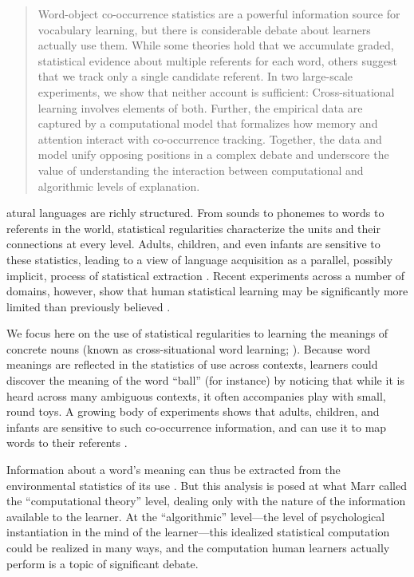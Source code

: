 \documentclass{pnastwo}
\begin{document}
\begin{article}
\begin{abstract}
Word-object co-occurrence statistics are a powerful information source for vocabulary learning, but there is considerable debate about learners actually use them. While some theories hold that we accumulate graded, statistical evidence about multiple referents for each word, others suggest that we track only a single candidate referent. In two large-scale experiments, we show that neither account is sufficient: Cross-situational learning involves elements of both. Further, the empirical data are captured by a computational model that formalizes how memory and attention interact with co-occurrence tracking. Together, the data and model unify opposing positions in a complex debate and underscore the value of understanding the interaction between computational and algorithmic levels of explanation.
\end{abstract}

atural languages are richly structured. From sounds to phonemes to words to referents in the world, statistical regularities characterize the units and their connections at every level. Adults, children, and even infants are sensitive to these statistics, leading to a view of language acquisition as a parallel, possibly implicit, process of statistical extraction \citep{Saffran1996a, Gomez2000}. Recent experiments across a number of domains, however, show that human statistical learning may be significantly more limited than previously believed \citep{Johnson2010c, Yurovsky2012c, Trueswell2013}.

We focus here on the use of statistical regularities to learning the meanings of concrete nouns (known as cross-situational word learning; \citealp{Pinker1989, Siskind1996, Yu2007}). Because word meanings are reflected in the statistics of use across contexts, learners could discover the meaning of the word ``ball'' (for instance) by noticing that while it is heard across many ambiguous contexts, it often accompanies play with small, round toys. A growing body of experiments shows that adults, children, and infants are sensitive to such co-occurrence information, and can use it to map words to their referents \citep{Yu2007, Smith2008, Scott2012, Vlach2013}.

Information about a word's meaning can thus be extracted from the environmental statistics of its use \cite{Frank2009a}. But this analysis is posed at what Marr \citep{Marr1982} called the ``computational theory'' level, dealing only with the nature of the information available to the learner. At the ``algorithmic'' level---the level of psychological instantiation in the mind of the learner---this idealized statistical computation could be realized in many ways, and the computation human learners actually perform is a topic of significant debate. 


\end{article}
\end{document}
